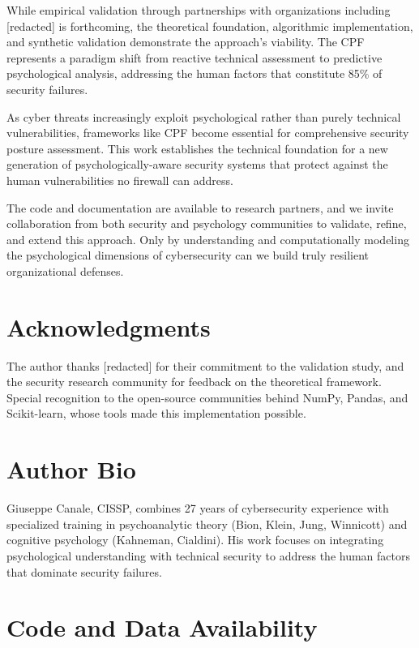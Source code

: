 \documentclass[11pt,a4paper]{article}
\begin{document}
While empirical validation through partnerships with organizations including [redacted] is forthcoming, the theoretical foundation, algorithmic implementation, and synthetic validation demonstrate the approach's viability. The CPF represents a paradigm shift from reactive technical assessment to predictive psychological analysis, addressing the human factors that constitute 85\% of security failures.

As cyber threats increasingly exploit psychological rather than purely technical vulnerabilities, frameworks like CPF become essential for comprehensive security posture assessment. This work establishes the technical foundation for a new generation of psychologically-aware security systems that protect against the human vulnerabilities no firewall can address.

The code and documentation are available to research partners, and we invite collaboration from both security and psychology communities to validate, refine, and extend this approach. Only by understanding and computationally modeling the psychological dimensions of cybersecurity can we build truly resilient organizational defenses.

\section*{Acknowledgments}

The author thanks [redacted] for their commitment to the validation study, and the security research community for feedback on the theoretical framework. Special recognition to the open-source communities behind NumPy, Pandas, and Scikit-learn, whose tools made this implementation possible.

\section*{Author Bio}

Giuseppe Canale, CISSP, combines 27 years of cybersecurity experience with specialized training in psychoanalytic theory (Bion, Klein, Jung, Winnicott) and cognitive psychology (Kahneman, Cialdini). His work focuses on integrating psychological understanding with technical security to address the human factors that dominate security failures.

\section*{Code and Data Availability}
\end{document}
